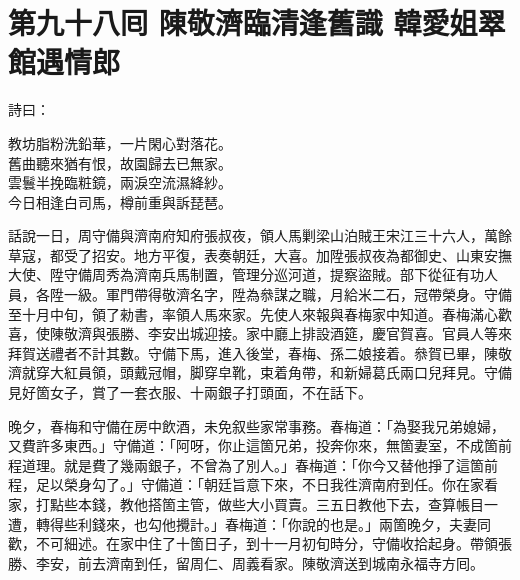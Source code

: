 
\chapter*{第九十八囘 陳敬濟臨清逢舊識 韓愛姐翠館遇情郎}


詩曰：

\begin{myquote}
教坊脂粉洗鉛華，一片閑心對落花。\\舊曲聽來猶有恨，故園歸去已無家。\\雲鬟半挽臨粧鏡，兩淚空流濕絳紗。\\今日相逢白司馬，樽前重與訴琵琶。
\end{myquote}

話說一日，周守備與濟南府知府張叔夜，領人馬剿梁山泊賊王宋江三十六人，萬餘草寇，都受了招安。地方平復，表奏朝廷，大喜。加陞張叔夜為都御史、山東安撫大使、陞守備周秀為濟南兵馬制置，管理分巡河道，提察盜賊。部下從征有功人員，各陞一級。軍門帶得敬濟名字，陞為叅謀之職，月給米二石，冠帶榮身。守備至十月中旬，領了勑書，率領人馬來家。先使人來報與春梅家中知道。春梅滿心歡喜，使陳敬濟與張勝、李安出城迎接。家中廳上排設酒筵，慶官賀喜。官員人等來拜賀送禮者不計其數。守備下馬，進入後堂，春梅、孫二娘接着。叅賀已畢，陳敬濟就穿大紅員領，頭戴冠帽，脚穿皁靴，束着角帶，和新婦葛氏兩口兒拜見。{}守備見好箇女子，賞了一套衣服、十兩銀子打頭面，不在話下。

晚夕，春梅和守備在房中飲酒，未免叙些家常事務。春梅道：「為娶我兄弟媳婦，又費許多東西。」守備道：「阿呀，你止這箇兄弟，投奔你來，無箇妻室，不成箇前程道理。就是費了幾兩銀子，不曾為了別人。」春梅道：「你今又替他掙了這箇前程，足以榮身勾了。」守備道：「朝廷旨意下來，不日我徃濟南府到任。你在家看家，打點些本錢，教他搭箇主管，做些大小買賣。三五日教他下去，查算帳目一遭，轉得些利錢來，也勾他攪計。」{}春梅道：「你說的也是。」兩箇晚夕，夫妻同歡，不可細述。在家中住了十箇日子，到十一月初旬時分，守備收拾起身。帶領張勝、李安，前去濟南到任，留周仁、周義看家。陳敬濟送到城南永福寺方囘。

